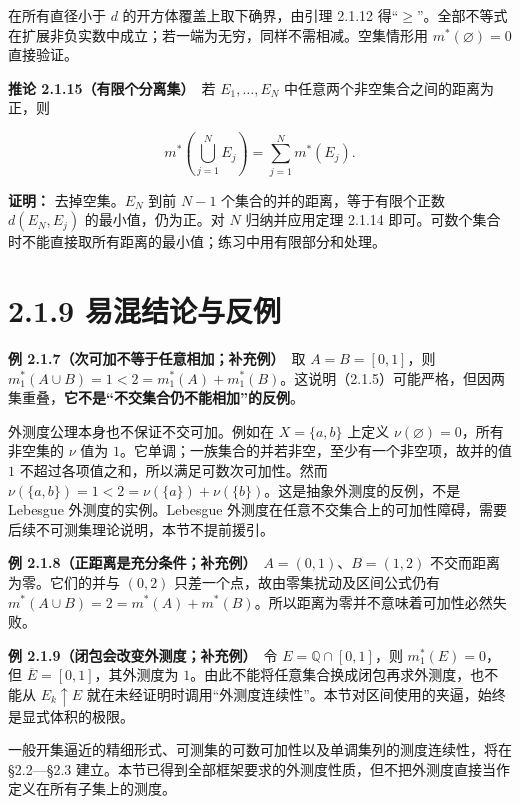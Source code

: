 \documentclass[11pt,a4paper]{article}
\begin{document}
在所有直径小于 \(d\) 的开方体覆盖上取下确界，由引理 2.1.12
得``\(\ge\)''。全部不等式在扩展非负实数中成立；若一端为无穷，同样不需相减。空集情形用
\(m^*(\varnothing)=0\) 直接验证。

\textbf{推论 2.1.15（有限个分离集）}　若 \(E_1,\ldots,E_N\)
中任意两个非空集合之间的距离为正，则

\begin{equation*}
m^*\left(\bigcup_{j=1}^NE_j\right)=\sum_{j=1}^Nm^*(E_j).
\tag{2.1.22}
\end{equation*}

\textbf{证明：} 去掉空集。\(E_N\) 到前 \(N-1\)
个集合的并的距离，等于有限个正数 \(d(E_N,E_j)\) 的最小值，仍为正。对
\(N\) 归纳并应用定理 2.1.14
即可。可数个集合时不能直接取所有距离的最小值；练习中用有限部分和处理。

\section[\S{}2.1.9
易混结论与反例]{2.1.9
易混结论与反例}\label{ux6613ux6df7ux7ed3ux8bbaux4e0eux53cdux4f8b}

\textbf{例 2.1.7（次可加不等于任意相加；补充例）}　取 \(A=B=[0,1]\)，则
\(m_1^*(A\cup B)=1<2=m_1^*(A)+m_1^*(B)\)。这说明（2.1.5）可能严格，但因两集重叠，\textbf{它不是``不交集合仍不能相加''的反例}。

外测度公理本身也不保证不交可加。例如在 \(X=\{a,b\}\) 上定义
\(\nu(\varnothing)=0\)，所有非空集的 \(\nu\) 值为
\(1\)。它单调；一族集合的并若非空，至少有一个非空项，故并的值 \(1\)
不超过各项值之和，所以满足可数次可加性。然而
\(\nu(\{a,b\})=1<2=\nu(\{a\})+\nu(\{b\})\)。这是抽象外测度的反例，不是
Lebesgue 外测度的实例。Lebesgue
外测度在任意不交集合上的可加性障碍，需要后续不可测集理论说明，本节不提前援引。

\textbf{例 2.1.8（正距离是充分条件；补充例）}　\(A=(0,1)\)、\(B=(1,2)\)
不交而距离为零。它们的并与 \((0,2)\)
只差一个点，故由零集扰动及区间公式仍有
\(m^*(A\cup B)=2=m^*(A)+m^*(B)\)。所以距离为零并不意味着可加性必然失败。

\textbf{例 2.1.9（闭包会改变外测度；补充例）}　令
\(E=\mathbb Q\cap[0,1]\)，则 \(m_1^*(E)=0\)，但
\(\overline E=[0,1]\)，其外测度为
\(1\)。由此不能将任意集合换成闭包再求外测度，也不能从 \(E_k\uparrow E\)
就在未经证明时调用``外测度连续性''。本节对区间使用的夹逼，始终是显式体积的极限。

一般开集逼近的精细形式、可测集的可数可加性以及单调集列的测度连续性，将在
§2.2---§2.3
建立。本节已得到全部框架要求的外测度性质，但不把外测度直接当作定义在所有子集上的测度。
\end{document}
